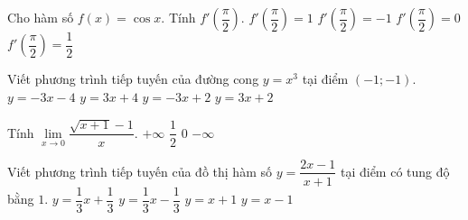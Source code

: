 \begin{ex}%
	Cho hàm số $f(x)=\cos x$. Tính $f'\left(\dfrac{\pi}{2}\right)$.
	\choice
	{$f'\left(\dfrac{\pi}{2}\right) = 1$}
	{\True $f'\left(\dfrac{\pi}{2}\right) = -1$}
	{$f' \left(\dfrac{\pi}{2} \right) = 0$}
	{$f' \left(\dfrac{\pi}{2} \right) = \dfrac{1}{2}$}
\end{ex}

\begin{ex}%
	Viết phương trình tiếp tuyến của đường cong $y=x^3$ tại điểm $(-1;-1)$.
	\choice
	{$y=-3x-4$}
	{$y=3x+4$}
	{$y=-3x+2$}
	{\True $y=3x+2$}
\end{ex}

\begin{ex}%
	Tính $\lim\limits_{x\rightarrow 0}\dfrac{\sqrt{x+1}-1}{x}$.
	\choice
	{$+\infty$}
	{\True $\dfrac{1}{2}$}
	{$0$}
	{$-\infty$}
\end{ex}

\begin{ex}%
	Viết phương trình tiếp tuyến của đồ thị hàm số $y=\dfrac{2x-1}{x+1}$ tại điểm có tung độ bằng $1$.
	\choice
	{\True $y=\dfrac{1}{3}x+\dfrac{1}{3}$}
	{$y=\dfrac{1}{3}x-\dfrac{1}{3}$}
	{$y=x+1$}
	{$y=x-1$}
\end{ex}

